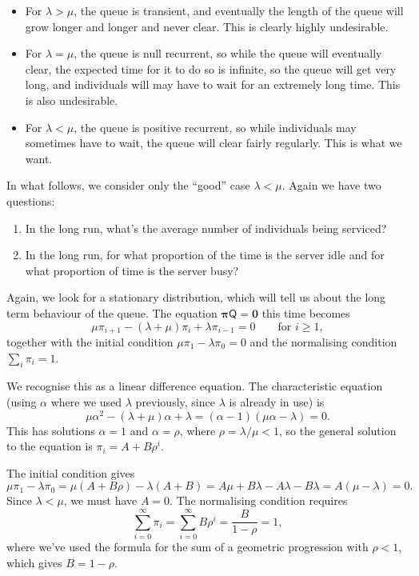 \documentclass[
  a4paper,
]{article}
\providecommand{\tightlist}{%
  \setlength{\itemsep}{0pt}\setlength{\parskip}{0pt}}
\theoremstyle{definition}
\theoremstyle{definition}
\theoremstyle{definition}
\theoremstyle{remark}
\begin{document}
\begin{itemize}
\tightlist
\item
  For \(\lambda > \mu\), the queue is transient, and eventually the length of the queue will grow longer and longer and never clear. This is clearly highly undesirable.
\item
  For \(\lambda = \mu\), the queue is null recurrent, so while the queue will eventually clear, the expected time for it to do so is infinite, so the queue will get very long, and individuals will may have to wait for an extremely long time. This is also undesirable.
\item
  For \(\lambda < \mu\), the queue is positive recurrent, so while individuals may sometimes have to wait, the queue will clear fairly regularly. This is what we want.
\end{itemize}

In what follows, we consider only the ``good'' case \(\lambda < \mu\). Again we have two questions:

\begin{enumerate}
\def\labelenumi{\arabic{enumi}.}
\tightlist
\item
  In the long run, what's the average number of individuals being serviced?
\item
  In the long run, for what proportion of the time is the server idle and for what proportion of time is the server busy?
\end{enumerate}

Again, we look for a stationary distribution, which will tell us about the long term behaviour of the queue. The equation \(\boldsymbol\pi\mathsf Q = \mathbf 0\) this time becomes
\[ \mu \pi_{i+1} - (\lambda + \mu) \pi_i + \lambda \pi_{i-1} = 0 \qquad \text{for $i \geq 1$} , \]
together with the initial condition \(\mu \pi_1 - \lambda \pi_0 = 0\) and the normalising condition \(\sum_i \pi_i = 1\).

We recognise this as a linear difference equation. The characteristic equation (using \(\alpha\) where we used \(\lambda\) previously, since \(\lambda\) is already in use) is
\[ \mu \alpha^2 - (\lambda + \mu)\alpha + \lambda = (\alpha - 1)(\mu \alpha - \lambda ) = 0 . \]
This has solutions \(\alpha = 1\) and \(\alpha = \rho\), where \(\rho = \lambda/\mu < 1\), so the general solution to the equation is \(\pi_i = A + B\rho^i\).

The initial condition gives
\[  \mu \pi_1 - \lambda \pi_0 = \mu(A + B\rho) - \lambda(A + B) = A\mu + B\lambda - A \lambda - B\lambda = A(\mu - \lambda) = 0 . \]
Since \(\lambda < \mu\), we must have \(A = 0\). The normalising condition requires
\[ \sum_{i=0}^\infty \pi_i = \sum_{i=0}^\infty B\rho^i = \frac{B}{1- \rho} = 1 , \]
where we've used the formula for the sum of a geometric progression with \(\rho < 1\), which gives \(B = 1 - \rho.\)
\end{document}
